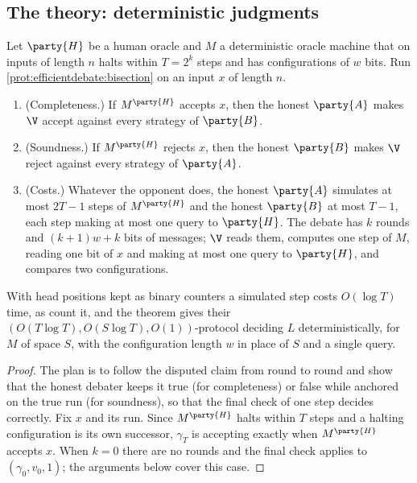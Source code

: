 \begin{refsection}
\section{The theory: deterministic judgments}\label{sec:efficientdebate:deterministic}

\begin{theorem}\label{thm:efficientdebate:main}
Let $\party{H}$ be a human oracle and $M$ a deterministic oracle machine that on inputs of length $n$ halts within $T=2^k$ steps and has configurations of $w$ bits. Run \cref{prot:efficientdebate:bisection} on an input $x$ of length $n$.
\begin{enumerate}
\item (Completeness.) If $M^{\party{H}}$ accepts $x$, then the honest $\party{A}$ makes $\V$ accept against every strategy of $\party{B}$.
\item (Soundness.) If $M^{\party{H}}$ rejects $x$, then the honest $\party{B}$ makes $\V$ reject against every strategy of $\party{A}$.
\item (Costs.) Whatever the opponent does, the honest $\party{A}$ simulates at most $2T-1$ steps of $M^{\party{H}}$ and the honest $\party{B}$ at most $T-1$, each step making at most one query to $\party{H}$. The debate has $k$ rounds and $(k+1)w+k$ bits of messages; $\V$ reads them, computes one step of $M$, reading one bit of $x$ and making at most one query to $\party{H}$, and compares two configurations.
\end{enumerate}
\end{theorem}

With head positions kept as binary counters a simulated step costs $O(\log T)$ time, as \textcite{BrownCohenEtAl2024} count it, and the theorem gives their $(O(T\log T),O(S\log T),O(1))$-protocol deciding $L$ deterministically, for $M$ of space $S$, with the configuration length $w$ in place of $S$ and a single query.

\begin{proof}
The plan is to follow the disputed claim from round to round and show that the honest debater keeps it true (for completeness) or false while anchored on the true run (for soundness), so that the final check of one step decides correctly. Fix $x$ and its run. Since $M^{\party{H}}$ halts within $T$ steps and a halting configuration is its own successor, $\gamma_T$ is accepting exactly when $M^{\party{H}}$ accepts $x$. When $k=0$ there are no rounds and the final check applies to $(\gamma_0,v_0,1)$; the arguments below cover this case.


\end{proof}
\end{refsection}
